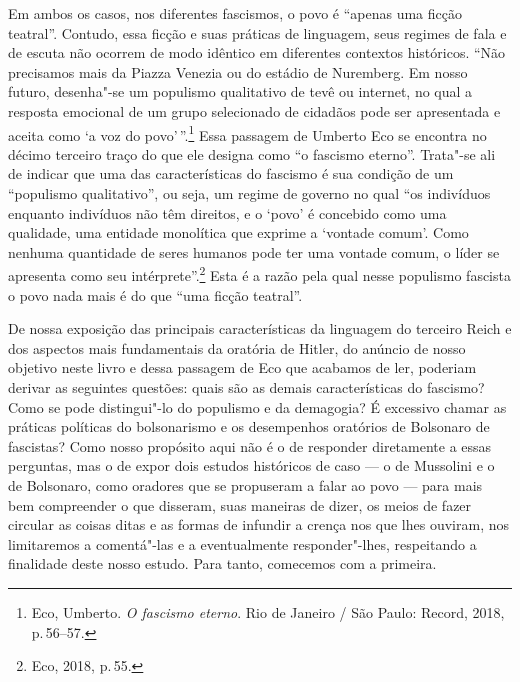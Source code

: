Em ambos os casos, nos diferentes fascismos, o povo é ``apenas uma
ficção teatral''. Contudo, essa ficção e suas práticas de linguagem,
seus regimes de fala e de escuta não ocorrem de modo idêntico em
diferentes contextos históricos. ``Não precisamos mais da Piazza Venezia
ou do estádio de Nuremberg. Em nosso futuro, desenha"-se um populismo
qualitativo de tevê ou internet, no qual a resposta emocional de um
grupo selecionado de cidadãos pode ser apresentada e aceita como `a voz
do povo'\,''.\footnote{Eco, Umberto. \emph{O fascismo eterno}. Rio de
  Janeiro / São Paulo: Record, 2018, p.\,56--57.} Essa passagem de
Umberto Eco se encontra no décimo terceiro traço do que ele designa como
``o fascismo eterno''. Trata"-se ali de indicar que uma das
características do fascismo é sua condição de um ``populismo
qualitativo'', ou seja, um regime de governo no qual ``os indivíduos
enquanto indivíduos não têm direitos, e o `povo' é concebido como uma
qualidade, uma entidade monolítica que exprime a `vontade comum'. Como
nenhuma quantidade de seres humanos pode ter uma vontade comum, o líder
se apresenta como seu intérprete''.\footnote{Eco, 2018, p.\,55.} Esta é a
razão pela qual nesse populismo fascista o povo nada mais é do que ``uma
ficção teatral''.

De nossa exposição das principais características da linguagem do
terceiro Reich e dos aspectos mais fundamentais da oratória de Hitler,
do anúncio de nosso objetivo neste livro e dessa passagem de Eco que
acabamos de ler, poderiam derivar as seguintes questões: quais são as
demais características do fascismo? Como se pode distingui"-lo do
populismo e da demagogia? É excessivo chamar as práticas políticas do
bolsonarismo e os desempenhos oratórios de Bolsonaro de fascistas? Como
nosso propósito aqui não é o de responder diretamente a essas perguntas,
mas o de expor dois estudos históricos de caso --- o de Mussolini e o de
Bolsonaro, como oradores que se propuseram a falar ao povo --- para mais
bem compreender o que disseram, suas maneiras de dizer, os meios de
fazer circular as coisas ditas e as formas de infundir a crença nos que
lhes ouviram, nos limitaremos a comentá"-las e a eventualmente
responder"-lhes, respeitando a finalidade deste nosso estudo. Para tanto,
comecemos com a primeira.

